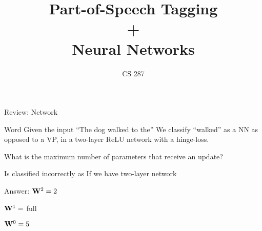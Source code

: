 \documentclass{beamer}
\title{Part-of-Speech Tagging \\ + \\ Neural Networks}
\date{}
\author{CS 287}
\begin{document}
\begin{frame}{Review: Network}
  
\end{frame}

\begin{frame}{Word}
  Given the input ``The dog walked to the'' 
  We classify ``walked'' as a NN as opposed 
  to a VP, in a two-layer ReLU network with 
   a hinge-loss. 
   
   What is the maximum number of parameters that 
   receive an update?

   
  
  Is classified incorrectly as 
  If we have two-layer network 

\end{frame}


\begin{frame}{Answer: }
  $\mathbf{W}^2 = 2$ 

  $\mathbf{W}^1 = $ full  

  $\mathbf{W}^0 = 5$  
  

\end{frame}
\end{document}
